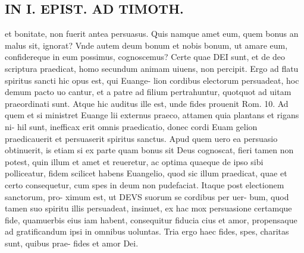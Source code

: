 \documentclass{article}
\begin{document}
\begin{pages}
\section*{IN I. EPIST. AD TIMOTH. }\pstart et bonitate, non fuerit antea persuasus. Quis namque amet eum, quem bonus an malus sit, ignorat? Vnde autem deum bonum et nobis bonum, ut amare eum, confidereque in eum possimus, cognoscemus? Certe quae DEI sunt, et de deo scriptura praedicat, homo secundum animam uiuens, non percipit.   \pend\pstart Ergo ad flatu spiritus sancti hic opus est, qui Euange- lion cordibus electorum persuadeat, hoc demum pacto uo cantur, et a patre ad filium pertrahuntur, quotquot ad uitam praeordinati sunt.  Atque hic auditus ille est, unde fides prouenit Rom. 10.  Ad quem et si ministret Euange lii externus praeco, attamen quia plantans et rigans ni- hil sunt, inefficax erit omnis praedicatio, donec cordi Euam gelion praedicauerit et persuaserit spiritus sanctus.  Apud quem uero ea persuasio obtinuerit, is etiam si ex parte quam bonus sit Deus cognoscat, fieri tamen non potest, quin illum et amet et reueretur, ac optima quaeque de ipso sibi polliceatur, fidem scilicet habens Euangelio, quod sic illum praedicat, quae et certo consequetur, cum spes in deum non pudefaciat.  Itaque post electionem sanctorum, pro- ximum est, ut DEVS suorum se cordibus per uer- bum, quod tamen suo spiritu illis persuadeat, insinuet, ex hac mox persuasione certamque fide, quamuerbis eius iam habent, consequitur fiducia cius et amor, propensaque ad gratificandum ipsi in omnibus uoluntas.   \pend\pstart Tria ergo haec fides, spes, charitas sunt, quibus prae-  \pendVnde fides et amor Dei.  
\end{pages}
\end{document}
